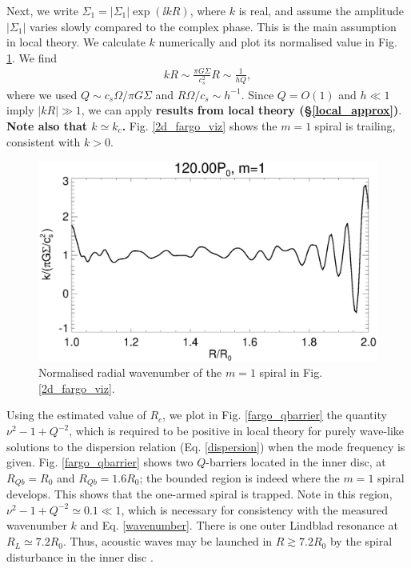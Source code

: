 Next, we write $\Sigma_1 = 
|\Sigma_1|\exp{(\ii kR)}$, where $k$ is real, and assume the amplitude
$|\Sigma_1|$ varies slowly compared to the complex phase. This is the
main assumption in local theory. We calculate $k$ numerically and plot
its normalised value in Fig. \ref{fargo_wavenumber}. We find 
\begin{align*}
  kR \sim \frac{\pi G \Sigma}{c_s^2}R \sim \frac{1}{hQ}, 
\end{align*}
where we used $Q\sim c_s\Omega/\pi G \Sigma$ and $R\Omega/c_s\sim
h^{-1}$. Since $Q=O(1)$ and $h\ll 1$ imply $|kR|\gg 1$, we 
can apply {\bf results from local theory
  (\S\ref{local_approx})}. {\bf Note also that $k\simeq k_c$. }
Fig. \ref{2d_fargo_viz} shows the $m=1$
spiral is trailing, consistent with $k>0$. 
 
\begin{figure}
  \includegraphics[width=\linewidth]{figures/m1_analysis_kr120_fargo}
  \caption{Normalised radial wavenumber of the $m=1$ spiral in 
    Fig. \ref{2d_fargo_viz}.\label{fargo_wavenumber}} 
\end{figure}   


Using the estimated value of $R_c$, we plot in
Fig. \ref{fargo_qbarrier} the quantity $\nu^2 - 1 + Q^{-2}$, which is
required to be positive in local theory for purely wave-like
solutions to the dispersion relation (Eq. \ref{dispersion}) when the
mode frequency is given. 
Fig. \ref{fargo_qbarrier} shows two $Q$-barriers located in
the inner disc, at $R_{Qb}=R_0$ and $R_{Qb}=1.6R_0$; the bounded region is indeed 
where the $m=1$ spiral develops. This shows that the one-armed 
spiral is trapped. Note in this region, $\nu^2 - 1 + 
Q^{-2}\simeq 0.1\ll 1$, which is necessary for consistency with 
the measured wavenumber $k$ and Eq. \ref{wavenumber}.  
There is one outer Lindblad resonance at $R_L\simeq
7.2R_0$. Thus, acoustic waves may be launched in $R\gtrsim 7.2R_0$ by
the spiral disturbance in the inner disc \citep{lin11b}. 

